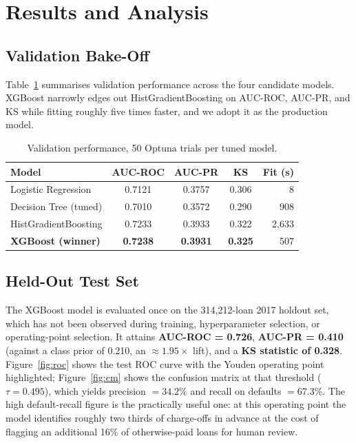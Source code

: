 \documentclass[conference]{IEEEtran}
\begin{document}
\section{Results and Analysis}

\subsection{Validation Bake-Off}

Table~\ref{tab:bakeoff} summarises validation performance across the four
candidate models. XGBoost narrowly edges out HistGradientBoosting on
AUC-ROC, AUC-PR, and KS while fitting roughly five times faster, and we
adopt it as the production model.

\begin{table}[t]
\caption{Validation performance, 50 Optuna trials per tuned model.}
\label{tab:bakeoff}
\centering
\begin{tabular}{l c c c r}
\toprule
\textbf{Model} & \textbf{AUC-ROC} & \textbf{AUC-PR} & \textbf{KS} & \textbf{Fit (s)} \\
\midrule
Logistic Regression       & 0.7121 & 0.3757 & 0.306 & 8 \\
Decision Tree (tuned)     & 0.7010 & 0.3572 & 0.290 & 908 \\
HistGradientBoosting      & 0.7233 & 0.3933 & 0.322 & 2{,}633 \\
\textbf{XGBoost (winner)} & \textbf{0.7238} & \textbf{0.3931} & \textbf{0.325} & 507 \\
\bottomrule
\end{tabular}
\end{table}

\subsection{Held-Out Test Set}

The XGBoost model is evaluated once on the 314{,}212-loan 2017 holdout set,
which has not been observed during training, hyperparameter selection, or
operating-point selection. It attains \textbf{AUC-ROC = 0.726},
\textbf{AUC-PR = 0.410} (against a class prior of 0.210, an
$\approx 1.95\times$ lift), and a \textbf{KS statistic of 0.328}.
Figure~\ref{fig:roc} shows the test ROC curve with the Youden operating
point highlighted; Figure~\ref{fig:cm} shows the confusion matrix at that
threshold ($\tau = 0.495$), which yields precision $= 34.2\%$ and recall on
defaults $= 67.3\%$. The high default-recall figure is the practically
useful one: at this operating point the model identifies roughly two thirds
of charge-offs in advance at the cost of flagging an additional 16\% of
otherwise-paid loans for human review.
\end{document}
